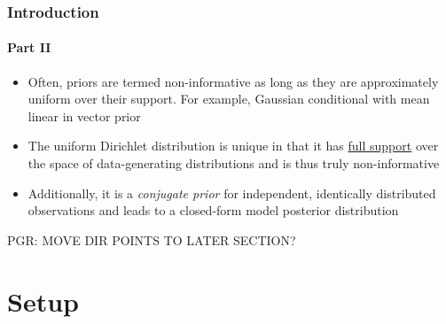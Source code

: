 \documentclass{beamer}
\begin{document}
\begin{frame}
\frametitle{Introduction}
\framesubtitle{Part II}

\begin{itemize}
\item Often, priors are termed non-informative as long as they are approximately uniform over their support. For example, Gaussian conditional with mean linear in vector prior
\vspace{0.5em}
\item The uniform Dirichlet distribution is unique in that it has \underline{full support} over the space of data-generating distributions and is thus truly non-informative
\vspace{0.5em}
\item Additionally, it is a \emph{conjugate prior} for independent, identically distributed observations and leads to a closed-form model posterior distribution

\end{itemize}

PGR: MOVE DIR POINTS TO LATER SECTION?

\end{frame}



\section{Setup}
\end{document}
